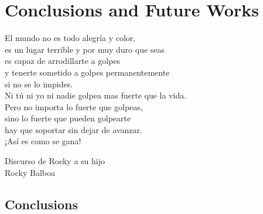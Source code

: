% 
% 
% 
% 
% 
% 
% 

\chapter{Conclusions and Future Works}
\label{cha:conclusions_and_future_works}

\begin{FraseCelebre}
	\begin{Frase}
		El mundo no es todo alegría y color, \\
		es un lugar terrible y por muy duro que seas \\
		es capaz de arrodillarte a golpes \\
		y tenerte sometido a golpes permanentemente \\
		si no se lo impides. \\
		Ni tú ni yo ni nadie golpea mas fuerte que la vida. \\
		Pero no importa lo fuerte que golpeas, \\
		sino lo fuerte que pueden golpearte \\
		hay que soportar sin dejar de avanzar. \\
		¡Así es como se gana!
	\end{Frase}
	\begin{Fuente}
		Discurso de Rocky a su hijo \\
		Rocky Balboa
	\end{Fuente}
\end{FraseCelebre}

\section{Conclusions}
\label{sec:6_introduction}

